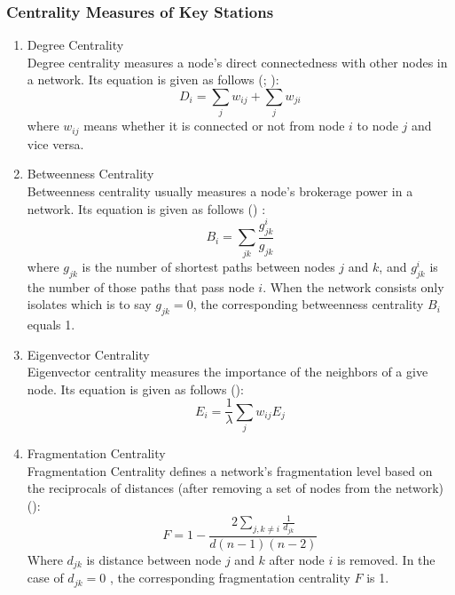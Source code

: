 \documentclass[a4paper,reqno,]{article}
\begin{document}
\subsubsection{Centrality Measures of Key Stations}
\begin{enumerate}
\item Degree Centrality
\\Degree centrality measures a node’s direct connectedness with other nodes in a network. Its equation is given as follows (\cite{freeman1978centrality}; \cite{an2016keyplayer}):
\begin{equation}
D_{i} =\sum\limits_{j}{w_{ij}} +\sum\limits_{j}{w_{ji}}
\end{equation}
where $w_{ij}$ means whether it is connected or not from node $i$ to node $j$ and vice versa. 
\item Betweenness Centrality
\\Betweenness centrality usually measures a node’s brokerage power in a network. Its equation is given as follows (\cite{an2016keyplayer}) : 
\begin{equation}
B_{i} = \sum\limits_{jk}\frac{g_{jk}^{i}}{g_{jk}}
\end{equation}
\label{equ:bet}
where $g_{jk}$ is the number of shortest paths between nodes $j$ and $k$, and $g_{jk}^{i}$ is the number of those paths that pass node $i$. When the network consists only isolates which is to say $g_{jk}=0$, the corresponding  betweenness centrality $B_{i}$ equals 1.
\item Eigenvector Centrality
\\Eigenvector centrality measures the importance of the neighbors of a give node. Its equation is given as follows (\cite{an2016keyplayer}):
\begin{equation}
E_{i} = \frac{1}{\lambda}\sum\limits_{j}w_{ij}E_{j}
\end{equation}
\item Fragmentation Centrality
\\Fragmentation Centrality defines a network's fragmentation level based on the reciprocals of distances (after removing a set of nodes from the network) (\cite{borgatti2006identifying}):
\begin{equation}
F = 1-\frac{2\sum\limits_{j,k\neq{i}}{\frac{1}{d_{jk}}}}{d(n-1)(n-2)}
\end{equation}
Where $d_{jk}$ is distance between node $j$ and $k$ after node $i$ is removed.  In the case of $d_{jk}= 0$ , the corresponding fragmentation centrality $F$ is 1.
\end{enumerate}
\end{document}
